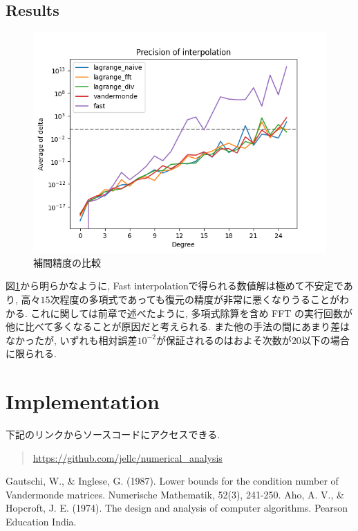 \documentclass[uplatex,dvipdfmx,titlepage]{jsarticle}
\begin{document}
  \subsection{Results}
  \begin{figure}[ht]
    \centering
    \includegraphics{../test/fig.png}
    \caption{補間精度の比較}
    \label{1}
  \end{figure}

  図\ref{1}から明らかなように, Fast interpolationで得られる数値解は極めて不安定であり, 高々$15$次程度の多項式であっても復元の精度が非常に悪くなりうることがわかる.
  これに関しては前章で述べたように, 多項式除算を含め FFT の実行回数が他に比べて多くなることが原因だと考えられる.
  また他の手法の間にあまり差はなかったが, いずれも相対誤差$10^{-2}$が保証されるのはおよそ次数が$20$以下の場合に限られる.

  \appendix
  \section{Implementation}
  下記のリンクからソースコードにアクセスできる.
  \begin{quote}
    \url{https://github.com/jellc/numerical_analysis}
  \end{quote}

  \begin{thebibliography}{5}
     Gautschi, W., \& Inglese, G. (1987). Lower bounds for the condition number of Vandermonde matrices. Numerische Mathematik, 52(3), 241-250.
     Aho, A. V., \& Hopcroft, J. E. (1974). The design and analysis of computer algorithms. Pearson Education India.
  \end{thebibliography}
\end{document}
